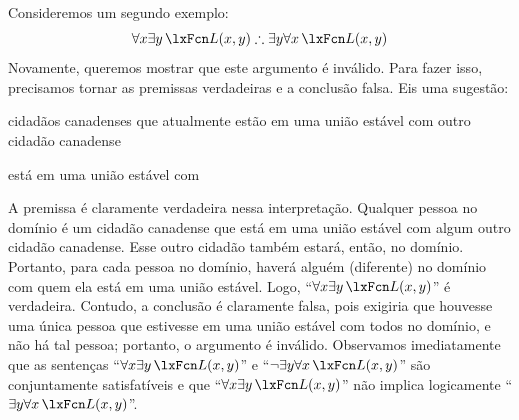 Consideremos um segundo exemplo:
$$\forall x \exists y\, \atom{L}{x,y} \therefore \exists y \forall x\, \atom{L}{x,y}$$
Novamente, queremos mostrar que este argumento é inválido. Para fazer isso, precisamos tornar as premissas verdadeiras e a conclusão falsa. Eis uma sugestão:
\begin{ekey}
\item[\text{domínio}] cidadãos canadenses que atualmente estão em uma união estável com outro cidadão canadense
\item[\atom{L}{x,y}]  está em uma união estável com 
\end{ekey}
A premissa é claramente verdadeira nessa interpretação. Qualquer pessoa no domínio é um cidadão canadense que está em uma união estável com algum outro cidadão canadense. Esse outro cidadão também estará, então, no domínio. Portanto, para cada pessoa no domínio, haverá alguém (diferente) no domínio com quem ela está em uma união estável. Logo, \textquotedblleft $\forall x \exists y\, \atom{L}{x,y}$\textquotedblright{} é verdadeira. Contudo, a conclusão é claramente falsa, pois exigiria que houvesse uma única pessoa que estivesse em uma união estável com todos no domínio, e não há tal pessoa; portanto, o argumento é inválido. Observamos imediatamente que as sentenças \textquotedblleft $\forall x \exists y\, \atom{L}{x,y}$\textquotedblright{} e \textquotedblleft $\enot\exists y \forall x\, \atom{L}{x,y}$\textquotedblright{} são conjuntamente satisfatíveis e que \textquotedblleft $\forall x \exists y\, \atom{L}{x,y}$\textquotedblright{} não implica logicamente \textquotedblleft $\exists y \forall x\, \atom{L}{x,y}$\textquotedblright{}.

